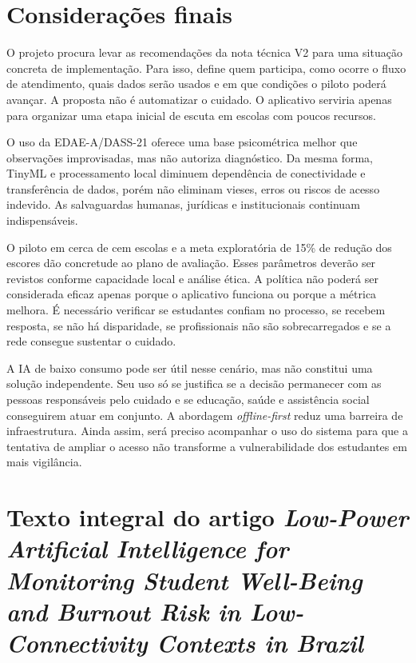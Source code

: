 \documentclass[
  12pt,
  openright,
  oneside,
  a4paper,
  english,
  brazil
]{abntex2}
\begin{document}
\chapter{Considerações finais}

O projeto procura levar as recomendações da nota técnica V2 para uma situação
concreta de implementação. Para isso, define quem participa, como ocorre o fluxo
de atendimento, quais dados serão usados e em que condições o piloto poderá
avançar. A proposta não é automatizar o cuidado. O aplicativo serviria apenas
para organizar uma etapa inicial de escuta em escolas com poucos recursos.

O uso da EDAE-A/DASS-21 oferece uma base psicométrica melhor que observações
improvisadas, mas não autoriza diagnóstico. Da mesma forma, TinyML e processamento
local diminuem dependência de conectividade e transferência de dados, porém não
eliminam vieses, erros ou riscos de acesso indevido. As salvaguardas humanas,
jurídicas e institucionais continuam indispensáveis.

O piloto em cerca de cem escolas e a meta exploratória de 15\% de redução dos
escores dão concretude ao plano de avaliação. Esses parâmetros deverão ser
revistos conforme capacidade local e análise ética. A política não poderá ser
considerada eficaz apenas porque o aplicativo funciona ou porque a métrica
melhora. É necessário verificar se estudantes confiam no processo, se recebem
resposta, se não há disparidade, se profissionais não são sobrecarregados e se a
rede consegue sustentar o cuidado.

A IA de baixo consumo pode ser útil nesse cenário, mas não constitui uma
solução independente. Seu uso só se justifica se a decisão permanecer com as
pessoas responsáveis pelo cuidado e se educação, saúde e assistência social
conseguirem atuar em conjunto. A abordagem \emph{offline-first} reduz uma
barreira de infraestrutura. Ainda assim, será preciso acompanhar o uso do
sistema para que a tentativa de ampliar o acesso não transforme a
vulnerabilidade dos estudantes em mais vigilância.

\postextual



\iffalse %

\chapter{Texto integral do artigo \emph{Low-Power Artificial Intelligence for Monitoring Student Well-Being and Burnout Risk in Low-Connectivity Contexts in Brazil}}
\end{document}
